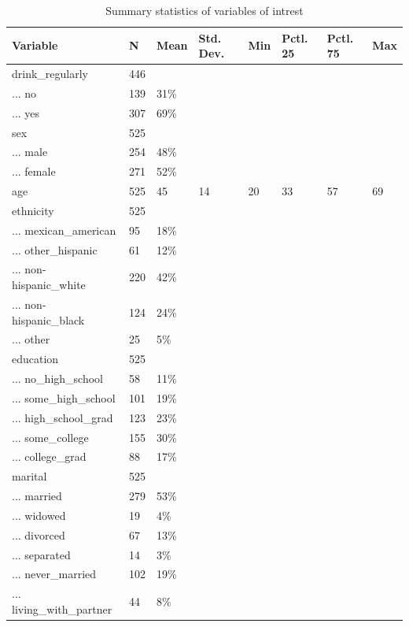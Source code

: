 \documentclass[
]{article}
\begin{document}
\begin{table}

\caption{\label{tab:data-sum}Summary statistics of variables of intrest}
\centering
\begin{tabular}[t]{llllllll}
\toprule
Variable & N & Mean & Std. Dev. & Min & Pctl. 25 & Pctl. 75 & Max\\
\midrule
drink\_regularly & 446 &  &  &  &  &  & \\
... no & 139 & 31\% &  &  &  &  & \\
... yes & 307 & 69\% &  &  &  &  & \\
sex & 525 &  &  &  &  &  & \\
... male & 254 & 48\% &  &  &  &  & \\
\addlinespace
... female & 271 & 52\% &  &  &  &  & \\
age & 525 & 45 & 14 & 20 & 33 & 57 & 69\\
ethnicity & 525 &  &  &  &  &  & \\
... mexican\_american & 95 & 18\% &  &  &  &  & \\
... other\_hispanic & 61 & 12\% &  &  &  &  & \\
\addlinespace
... non-hispanic\_white & 220 & 42\% &  &  &  &  & \\
... non-hispanic\_black & 124 & 24\% &  &  &  &  & \\
... other & 25 & 5\% &  &  &  &  & \\
education & 525 &  &  &  &  &  & \\
... no\_high\_school & 58 & 11\% &  &  &  &  & \\
\addlinespace
... some\_high\_school & 101 & 19\% &  &  &  &  & \\
... high\_school\_grad & 123 & 23\% &  &  &  &  & \\
... some\_college & 155 & 30\% &  &  &  &  & \\
... college\_grad & 88 & 17\% &  &  &  &  & \\
marital & 525 &  &  &  &  &  & \\
\addlinespace
... married & 279 & 53\% &  &  &  &  & \\
... widowed & 19 & 4\% &  &  &  &  & \\
... divorced & 67 & 13\% &  &  &  &  & \\
... separated & 14 & 3\% &  &  &  &  & \\
... never\_married & 102 & 19\% &  &  &  &  & \\
\addlinespace
... living\_with\_partner & 44 & 8\% &  &  &  &  & \\

\end{tabular}
\end{table}
\end{document}
